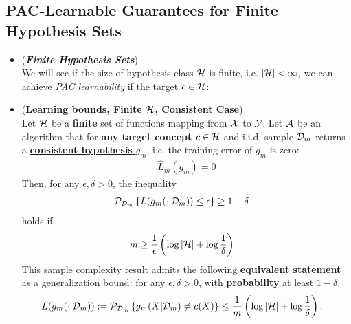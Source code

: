 \documentclass[11pt]{article}
\begin{document}
\subsection{PAC-Learnable Guarantees for Finite Hypothesis Sets}
\begin{itemize}
\item \begin{remark} (\emph{\textbf{Finite Hypothesis Sets}})\\
We will see if the size of hypothesis class ${\mathcal H}$ is finite, i.e. $\left\lvert {\mathcal H} \right\rvert < \infty$, we can achieve \emph{PAC learnability} if the target $c \in {\mathcal H}$:
\end{remark}

\item \begin{proposition} (\textbf{Learning bounds, Finite ${\mathcal H}$, Consistent Case}) \citep{mohri2018foundations}\\
Let ${\mathcal H}$ be a \textbf{finite} set of functions mapping from ${\mathcal X}$ to ${\mathcal Y}$. Let ${\mathcal A}$ be an algorithm that for \textbf{any target concept $c \in {\mathcal H}$} and i.i.d. sample ${\mathcal D}_m$ returns a \underline{\textbf{consistent hypothesis} $g_m$}, i.e. the training error of $g_m$ is zero:
\begin{align*}
\widehat{L}_{m}(g_m) = 0
\end{align*} 
Then, for any $\epsilon, \delta > 0$, the inequality 
\begin{align*}
{\mathcal P}_{{\mathcal D}_m}\left\{ L(g_m(\cdot|{\mathcal D}_{m})) \le \epsilon\right\} &\ge  1 - \delta
\end{align*} holds if
\begin{align}
m &\ge \frac{1}{\epsilon}\left(\log \left\lvert {\mathcal H} \right\rvert + \log\frac{1}{\delta}\right) \label{eqn: pac_sample_complexity_finite_case}
\end{align}
This sample complexity result admits the following \textbf{equivalent statement} as a generalization bound: for any $\epsilon, \delta > 0$, with \textbf{probability} at least $1 - \delta$,
\begin{align}
 L(g_m(\cdot|{\mathcal D}_{m})) :=   {\mathcal P}_{{\mathcal D}_{m}}\left\{g_m(X|{\mathcal D}_{m}) \neq c(X)\right\}&\le \frac{1}{m}\left(\log\left\lvert {\mathcal H} \right\rvert + \log\frac{1}{\delta} \right). \label{eqn: pac_sample_complexity_finite_case_consistency}
\end{align}
\end{proposition}


\end{itemize}
\end{document}
